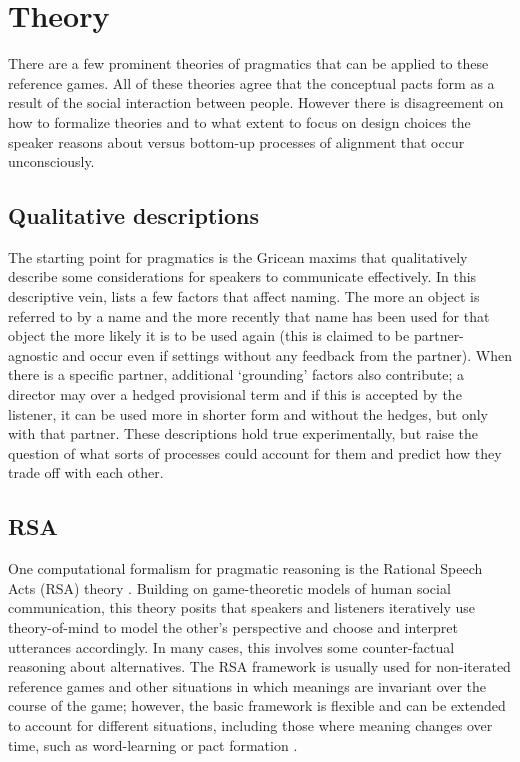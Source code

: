 \documentclass[11pt]{article}
\begin{document}
\section{Theory}
There are a few prominent theories of pragmatics that can be applied to these reference games. All of these theories agree that the conceptual pacts form as a result of the social interaction between people. However there is disagreement on how to formalize theories and to what extent to focus on design choices the speaker reasons about versus bottom-up processes of alignment that occur unconsciously. 

\subsection{Qualitative descriptions} 
The starting point for pragmatics is the Gricean maxims that qualitatively describe some considerations for speakers to communicate effectively. In this descriptive vein, \cite{brennanConceptualPactsLexical} lists a few factors that affect naming. The more an object is referred to by a name and the more recently that name has been used for that object the more likely it is to be used again (this is claimed to be partner-agnostic and occur even if settings without any feedback from the partner). When there is a specific partner, additional `grounding' factors also contribute; a director may over a hedged provisional term and if this is accepted by the listener, it can be used more in shorter form and without the hedges, but only with that partner. These descriptions hold true experimentally, but raise the question of what sorts of processes could account for them and predict how they trade off with each other. 

\subsection{RSA}
One computational formalism for pragmatic reasoning is the Rational Speech Acts (RSA) theory \cite{frankPredictingPragmaticReasoning2012}. Building on game-theoretic models of human social communication, this theory posits that speakers and listeners iteratively use theory-of-mind to model the other's perspective and choose and interpret utterances accordingly. In many cases, this involves some counter-factual reasoning about alternatives. The RSA framework is usually used for non-iterated reference games and other situations in which meanings are invariant over the course of the game; however, the basic framework is flexible and can be extended to account for different situations, including those where meaning changes over time, such as word-learning or pact formation \cite{goodmanPragmaticLanguageInterpretation2016}.
\end{document}
